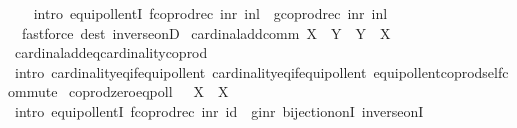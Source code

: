 \begin{isabellebody}
%
\isadelimproof
\ \ %
\endisadelimproof
%
\isatagproof
{}\isamarkupfalse%
\ {\isacharparenleft}{\kern0pt}intro\ equipollentI{\isacharbrackleft}{\kern0pt}\ {\isacharquery}{\kern0pt}f{\isacharequal}{\kern0pt}{\isachardoublequoteopen}coprod{\isacharunderscore}{\kern0pt}rec\ inr\ inl{\isachardoublequoteclose}\ \ {\isacharquery}{\kern0pt}g{\isacharequal}{\kern0pt}{\isachardoublequoteopen}coprod{\isacharunderscore}{\kern0pt}rec\ inr\ inl{\isachardoublequoteclose}{\isacharbrackright}{\kern0pt}{\isacharparenright}{\kern0pt}\isanewline
\ \ {\isacharparenleft}{\kern0pt}fastforce\ dest{\isacharcolon}{\kern0pt}\ inverse{\isacharunderscore}{\kern0pt}onD{\isacharparenright}{\kern0pt}%
\endisatagproof
{\isafoldproof}%
%
\isadelimproof
\isanewline
%
\endisadelimproof
\isanewline
{}\isamarkupfalse%
\ cardinal{\isacharunderscore}{\kern0pt}add{\isacharunderscore}{\kern0pt}comm{\isacharcolon}{\kern0pt}\ {\isachardoublequoteopen}X\ {\isasymoplus}\ Y\ {\isacharequal}{\kern0pt}\ Y\ {\isasymoplus}\ X{\isachardoublequoteclose}\isanewline
%
\isadelimproof
\ \ %
\endisadelimproof
%
\isatagproof
{}\isamarkupfalse%
\ cardinal{\isacharunderscore}{\kern0pt}add{\isacharunderscore}{\kern0pt}eq{\isacharunderscore}{\kern0pt}cardinality{\isacharunderscore}{\kern0pt}coprod\isanewline
\ \ \isamarkupfalse%
\ {\isacharparenleft}{\kern0pt}intro\ cardinality{\isacharunderscore}{\kern0pt}eq{\isacharunderscore}{\kern0pt}if{\isacharunderscore}{\kern0pt}equipollent\ cardinality{\isacharunderscore}{\kern0pt}eq{\isacharunderscore}{\kern0pt}if{\isacharunderscore}{\kern0pt}equipollent\ equipollent{\isacharunderscore}{\kern0pt}coprod{\isacharunderscore}{\kern0pt}self{\isacharunderscore}{\kern0pt}commute{\isacharparenright}{\kern0pt}%
\endisatagproof
{\isafoldproof}%
%
\isadelimproof
\isanewline
%
\endisadelimproof
\isanewline
{}\isamarkupfalse%
\ coprod{\isacharunderscore}{\kern0pt}zero{\isacharunderscore}{\kern0pt}eqpoll{\isacharcolon}{\kern0pt}\ {\isachardoublequoteopen}{\isacharbraceleft}{\kern0pt}{\isacharbraceright}{\kern0pt}\ {\isasymCoprod}\ X\ {\isasymapprox}\ X{\isachardoublequoteclose}\isanewline
%
\isadelimproof
\ \ %
\endisadelimproof
%
\isatagproof
{}\isamarkupfalse%
\ {\isacharparenleft}{\kern0pt}intro\ equipollentI{\isacharbrackleft}{\kern0pt}\ {\isacharquery}{\kern0pt}f{\isacharequal}{\kern0pt}{\isachardoublequoteopen}coprod{\isacharunderscore}{\kern0pt}rec\ inr\ id{\isachardoublequoteclose}\ \ {\isacharquery}{\kern0pt}g{\isacharequal}{\kern0pt}{\isachardoublequoteopen}inr{\isachardoublequoteclose}{\isacharbrackright}{\kern0pt}\ bijection{\isacharunderscore}{\kern0pt}onI\ inverse{\isacharunderscore}{\kern0pt}onI{\isacharparenright}{\kern0pt}\isanewline

\end{isabellebody}
